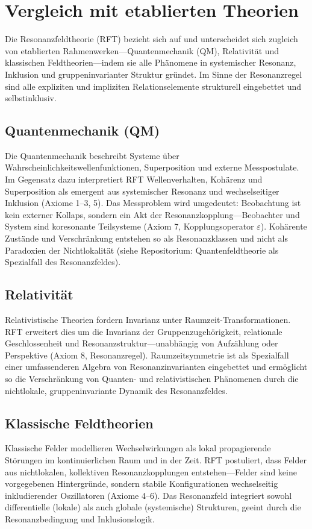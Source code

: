 \documentclass[12pt]{article}
\begin{document}
\section{Vergleich mit etablierten Theorien}

Die Resonanzfeldtheorie (RFT) bezieht sich auf und unterscheidet sich zugleich von etablierten Rahmenwerken—Quantenmechanik (QM), Relativität und klassischen Feldtheorien—indem sie alle Phänomene in systemischer Resonanz, Inklusion und gruppeninvarianter Struktur gründet. Im Sinne der Resonanzregel sind alle expliziten und impliziten Relationselemente strukturell eingebettet und selbstinklusiv.

\subsection{Quantenmechanik (QM)}
Die Quantenmechanik beschreibt Systeme über Wahrscheinlichkeitswellenfunktionen, Superposition und externe Messpostulate. Im Gegensatz dazu interpretiert RFT Wellenverhalten, Kohärenz und Superposition als emergent aus systemischer Resonanz und wechselseitiger Inklusion (Axiome 1–3, 5). Das Messproblem wird umgedeutet: Beobachtung ist kein externer Kollaps, sondern ein Akt der Resonanzkopplung—Beobachter und System sind koresonante Teilsysteme (Axiom 7, Kopplungsoperator $\varepsilon$). Kohärente Zustände und Verschränkung entstehen so als Resonanzklassen und nicht als Paradoxien der Nichtlokalität (siehe Repositorium: Quantenfeldtheorie als Spezialfall des Resonanzfeldes).

\subsection{Relativität}
Relativistische Theorien fordern Invarianz unter Raumzeit-Transformationen. RFT erweitert dies um die Invarianz der Gruppenzugehörigkeit, relationale Geschlossenheit und Resonanzstruktur—unabhängig von Aufzählung oder Perspektive (Axiom 8, Resonanzregel). Raumzeitsymmetrie ist als Spezialfall einer umfassenderen Algebra von Resonanzinvarianten eingebettet und ermöglicht so die Verschränkung von Quanten- und relativistischen Phänomenen durch die nichtlokale, gruppeninvariante Dynamik des Resonanzfeldes.

\subsection{Klassische Feldtheorien}
Klassische Felder modellieren Wechselwirkungen als lokal propagierende Störungen im kontinuierlichen Raum und in der Zeit. RFT postuliert, dass Felder aus nichtlokalen, kollektiven Resonanzkopplungen entstehen—Felder sind keine vorgegebenen Hintergründe, sondern stabile Konfigurationen wechselseitig inkludierender Oszillatoren (Axiome 4–6). Das Resonanzfeld integriert sowohl differentielle (lokale) als auch globale (systemische) Strukturen, geeint durch die Resonanzbedingung und Inklusionslogik.
\end{document}
